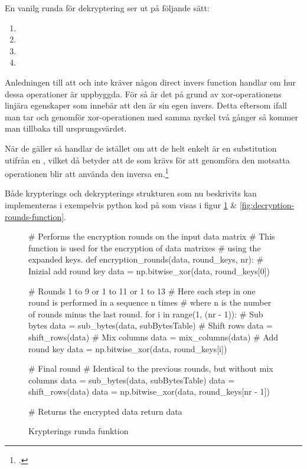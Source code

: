 En vanilg runda för dekryptering ser ut på följande sätt:

\begin{enumerate}
    \item {}
    \item {}
    \item {}
    \item {}
\end{enumerate}

Anledningen till att  och  inte kräver någon direct invers function handlar om hur dessa operationer
är uppbyggda. För  så är det på grund av \gls{xor}-operationens linjära egenskaper som innebär att den är sin egen invers.
Detta eftersom ifall man tar och genomför \gls{xor}-operationen med samma nyckel två gånger så kommer man tillbaka till ursprungsvärdet.

När de gäller 
så handlar de istället om att de helt enkelt är en substitution utifrån en , vilket då betyder att de som krävs för att genomföra den motsatta operationen
blir att använda den inversa en.\footcite{daemen1999aes}

Både krypterings och dekrypterings strukturen som nu beskrivits kan implementeras i exempelvis \gls{python} kod på som visas i figur \ref{fig:encryption-rounds-function} \& \ref{fig:decryption-rounds-function}.

\begin{figure}[H]
    \centering
    \begin{python}
    # Performs the encryption rounds on the input data matrix
    # This function is used for the encryption of data matrixes
    # using the expanded keys.
    def encryption_rounds(data, round_keys, nr):
        # Inizial add round key
        data = np.bitwise_xor(data, round_keys[0])

        # Rounds 1 to 9 or 1 to 11 or 1 to 13
        # Here each step in one round is performed in a sequence n times
        # where n is the number of rounds minus the last round.
        for i in range(1, (nr - 1)):
            # Sub bytes
            data = sub_bytes(data, subBytesTable)
            # Shift rows
            data = shift_rows(data)
            # Mix columns
            data = mix_columns(data)
            # Add round key
            data = np.bitwise_xor(data, round_keys[i])

        # Final round
        # Identical to the previous rounds, but without mix columns
        data = sub_bytes(data, subBytesTable)
        data = shift_rows(data)
        data = np.bitwise_xor(data, round_keys[nr - 1])

        # Returns the encrypted data
        return data

    \end{python}
    \caption{Krypterings runda funktion}
    \label{fig:encryption-rounds-function}
\end{figure}


